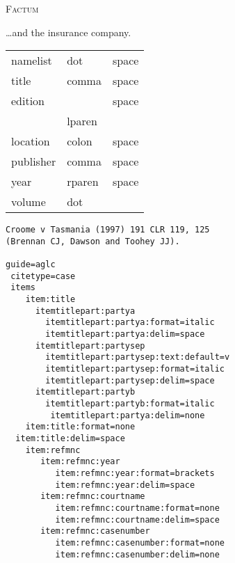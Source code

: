 \bigskip
\textsc{Factum} 

\medskip
\ldots and the insurance company.

\medskip
{}



\bigskip
\begin{tabular}{lll}
namelist & dot & space \\
title & comma & space \\
edition & & space \\
 & lparen &  \\
location & colon & space \\
publisher & comma & space \\
year & rparen & space \\
volume & dot &  \\
\end{tabular}




\begin{verbatim}
Croome v Tasmania (1997) 191 CLR 119, 125 
(Brennan CJ, Dawson and Toohey JJ). 

guide=aglc
 citetype=case
 items
 	item:title
 	  itemtitlepart:partya
 	    itemtitlepart:partya:format=italic
 	    itemtitlepart:partya:delim=space
 	  itemtitlepart:partysep
 	    itemtitlepart:partysep:text:default=v
 	    itemtitlepart:partysep:format=italic
 	    itemtitlepart:partysep:delim=space
 	  itemtitlepart:partyb
  	    itemtitlepart:partyb:format=italic
 	     itemtitlepart:partya:delim=none
 	item:title:format=none
  item:title:delim=space
   	item:refmnc
   	   item:refmnc:year
   	      item:refmnc:year:format=brackets
   	      item:refmnc:year:delim=space   	      
   	   item:refmnc:courtname
   	      item:refmnc:courtname:format=none
   	      item:refmnc:courtname:delim=space 
   	   item:refmnc:casenumber
   	      item:refmnc:casenumber:format=none
   	      item:refmnc:casenumber:delim=none

\end{verbatim}



